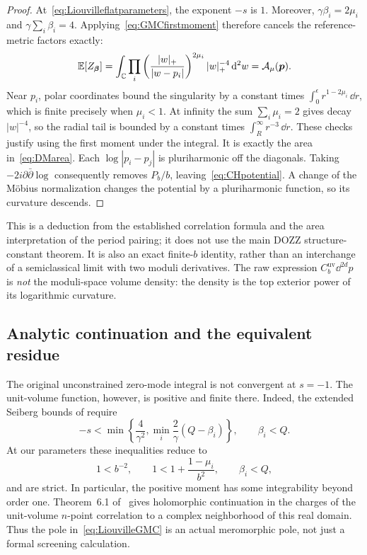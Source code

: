 \begin{proof}
At~\eqref{eq:Liouvilleflatparameters}, the exponent $-s$ is $1$.
Moreover, $\gamma\beta_i=2\mu_i$ and
$\gamma\sum_i\beta_i=4$. Applying~\eqref{eq:GMCfirstmoment}
therefore cancels the reference-metric factors exactly:
\[
 \mathbb E[Z_{\boldsymbol\beta}]
 =\int_{\mathbb C}
    \prod_i\left(\frac{|w|_+}{|w-p_i|}\right)^{2\mu_i}
    |w|_+^{-4}\mathop{}\!\mathrm d^2w
 =\mathcal A_\mu(\boldsymbol p).
\]
Near $p_i$, polar coordinates bound the singularity by a
constant times $\int_0^\epsilon r^{1-2\mu_i}\,\dd r$, which
is finite precisely when $\mu_i<1$. At infinity the sum
$\sum_i\mu_i=2$ gives decay $|w|^{-4}$, so the radial tail
is bounded by a constant times $\int_R^\infty r^{-3}\,\dd r$.
These checks justify using the first moment under the integral.
It is exactly the area in~\eqref{eq:DMarea}.
Each $\log|p_i-p_j|$ is pluriharmonic off the diagonals.
Taking $-2i\partial\bar\partial\log$ consequently removes
$P_b/b$, leaving~\eqref{eq:CHpotential}. A change of the
M\"obius normalization changes the potential by a pluriharmonic
function, so its curvature descends.
\end{proof}

This is a deduction from the established correlation formula and
the area interpretation of the period pairing; it does not use
the main DOZZ structure-constant theorem. It is also an exact
finite-$b$ identity, rather than an interchange of a semiclassical
limit with two moduli derivatives. The raw expression
$C_b^{\mathrm{uv}}\dd^{2d}p$ is \emph{not} the moduli-space
volume density: the density is the top exterior power of its
logarithmic curvature.

\subsection{Analytic continuation and the equivalent residue}

The original unconstrained zero-mode integral is not convergent
at $s=-1$. The unit-volume function, however, is positive and
finite there. Indeed, the extended Seiberg bounds of
\cite[eq.~(2.14)]{KRV} require
\[
 -s<\min\left\{\frac4{\gamma^2},
       \min_i\frac2\gamma(Q-\beta_i)\right\},\qquad \beta_i<Q.
\]
At our parameters these inequalities reduce to
\begin{equation}
 1<b^{-2},\qquad
 1<1+\frac{1-\mu_i}{b^2},\qquad \beta_i<Q,
 \label{eq:flatSeibergbounds}
\end{equation}
and are strict. In particular, the positive moment has some
integrability beyond order one. Theorem~6.1 of~\cite{KRV}
gives holomorphic continuation in the charges of the unit-volume
$n$-point correlation to a complex neighborhood of this real
domain. Thus the pole in~\eqref{eq:LiouvilleGMC} is an actual
meromorphic pole, not just a formal screening calculation.

